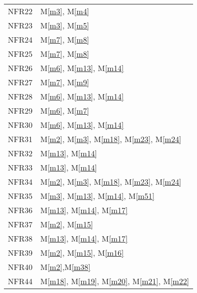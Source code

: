 \documentclass[12pt, titlepage]{article}
\newcommand{\mref}[1]{M\ref{#1}}
\begin{document}
\begin{longtable}{p{} p{}}
		NFR22 & \mref{m3}, \mref{m4} \\
		NFR23 & \mref{m3}, \mref{m5} \\
		\hline 
		\newpage
		\hline
		NFR24 & \mref{m7}, \mref{m8} \\
		NFR25 & \mref{m7}, \mref{m8} \\
		NFR26 & \mref{m6}, \mref{m13}, \mref{m14}\\
		NFR27 & \mref{m7}, \mref{m9}\\
		NFR28 & \mref{m6}, \mref{m13}, \mref{m14}\\
		NFR29 & \mref{m6}, \mref{m7}\\
		NFR30 & \mref{m6}, \mref{m13}, \mref{m14}\\
		NFR31 & \mref{m2}, \mref{m3}, \mref{m18}, \mref{m23}, \mref{m24} \\
		NFR32 & \mref{m13}, \mref{m14}\\
		NFR33 & \mref{m13}, \mref{m14}\\
		NFR34 & \mref{m2}, \mref{m3}, \mref{m18}, \mref{m23}, \mref{m24} \\
		NFR35 & \mref{m3}, \mref{m13}, \mref{m14}, \mref{m51} \\
		NFR36 & \mref{m13}, \mref{m14}, \mref{m17} \\
		NFR37 & \mref{m2}, \mref{m15} \\
		NFR38 & \mref{m13}, \mref{m14},  \mref{m17} \\
		NFR39 & \mref{m2}, \mref{m15}, \mref{m16} \\
		NFR40 & \mref{m2},\mref{m38} \\
		NFR44 & \mref{m18}, \mref{m19}, \mref{m20}, \mref{m21}, \mref{m22} \\
		\bottomrule
	\end{longtable}
\newpage
\end{document}
